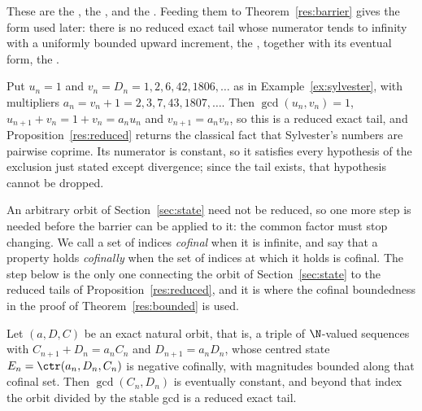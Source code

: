 \noindent These are the
, the
, and the
.  Feeding them to Theorem~\ref{res:barrier} gives the form used
later: there is no reduced exact tail whose numerator tends to infinity with a
uniformly bounded upward increment, the
, together with its eventual form, the
.

\begin{example}\label{ex:reduced}
Put $u_n=1$ and $v_n=D_n=1,2,6,42,1806,\ldots$ as in
Example~\ref{ex:sylvester}, with multipliers $a_n=v_n+1=2,3,7,43,1807,\ldots$.
Then $\gcd(u_n,v_n)=1$, $u_{n+1}+v_n=1+v_n=a_nu_n$ and $v_{n+1}=a_nv_n$, so
this is a reduced exact tail, and Proposition~\ref{res:reduced} returns the
classical fact that Sylvester's numbers are pairwise coprime.  Its numerator is
constant, so it satisfies every hypothesis of the exclusion just stated except
divergence; since the tail exists, that hypothesis cannot be dropped.
\end{example}

An arbitrary orbit of Section~\ref{sec:state} need not be reduced, so one more step is needed
before the barrier can be applied to it: the common factor must stop changing.
We call a set of indices \emph{cofinal} when it is infinite, and say that a
property holds \emph{cofinally} when the set of indices at which it holds is
cofinal.  The step below is the only one connecting the orbit of
Section~\ref{sec:state} to the reduced tails of
Proposition~\ref{res:reduced}, and it is where the cofinal boundedness in the
proof of Theorem~\ref{res:bounded} is used.

\begin{proposition}\label{res:gcdstab}
Let $(a,D,C)$ be an exact natural orbit, that is, a triple of $\N$-valued
sequences with $C_{n+1}+D_n=a_nC_n$ and $D_{n+1}=a_nD_n$, whose centred state
$E_n=\ctr(a_n,D_n,C_n)$ is negative cofinally, with magnitudes bounded along
that cofinal set.  Then
$\gcd(C_n,D_n)$ is eventually constant, and beyond that index the orbit divided
by the stable gcd is a reduced exact tail.
\end{proposition}

